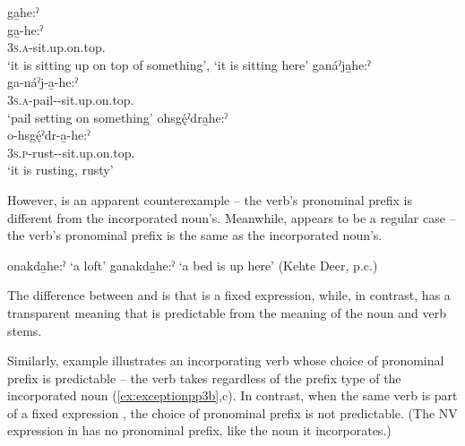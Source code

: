 \ea\label{ex:exceptionpp1} 
\ea ga̱he:ˀ\\
\gll ga̱-he:ˀ \\
\textsc{3s.a}-sit.up.on.top. {\stative}\\
\glt ‘it is sitting up on top of something’, ‘it is sitting here’ 
\ex ganáˀja̱he:ˀ\\
\gll ga-náˀj-a̱-he:ˀ\\
 \textsc{3s.a}-pail-{\joinerA}-sit.up.on.top. {\stative}\\
\glt `pail setting on something'
\ex ohsgę́ˀdra̱he:ˀ\\
\gll o-hsgę́ˀdr-a̱-he:ˀ\\
 \textsc{3s.p}-rust-{\joinerA}-sit.up.on.top. {\stative}\\
\glt `it is rusting, rusty'
\z
\z

However,  is an apparent counterexample -- the verb’s pronominal prefix is different from the incorporated noun’s. Meanwhile,  appears to be a regular case -- the verb’s pronominal prefix is the same as the incorporated noun’s. 

\ea\label{ex:exceptionpp2}
\ea onakda̱he:ˀ ‘a loft’ \label{ex:exceptionpp2a}
\ex ganakda̱he:ˀ ‘a bed is up here’ (Kehte Deer, p.c.)\label{ex:exceptionpp2b}
\z
\z

The difference between  and  is that  is a fixed expression, while, in contrast,  has a transparent meaning that is predictable from the meaning of the noun and verb stems. 

Similarly, example  illustrates an incorporating verb whose choice of pronominal prefix is predictable -- the verb takes  regardless of the prefix type of the incorporated noun (\ref{ex:exceptionpp3b},c). In contrast, when the same verb is part of a fixed expression , the choice of pronominal prefix is not predictable. (The NV expression in  has no pronominal prefix, like the noun it incorporates.)


